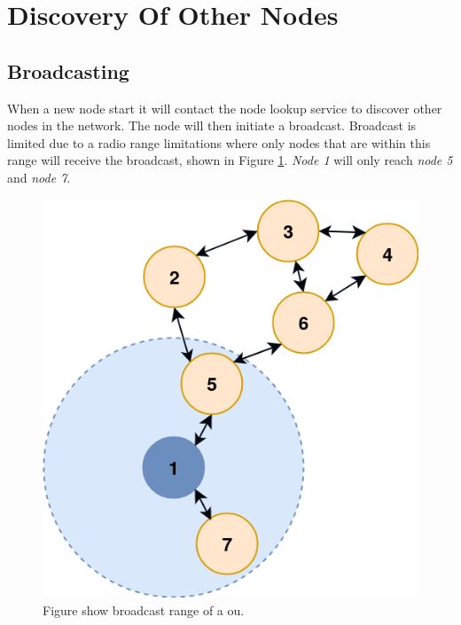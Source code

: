 \documentclass[USenglish]{uit-thesis}
\begin{document}
\section{Discovery Of Other Nodes}
\subsection{Broadcasting}
When a new node start it will contact the node lookup service to discover other nodes in the network. The node will then initiate a broadcast.
Broadcast is limited due to a radio range limitations where only nodes that are within this range will receive the broadcast, shown in Figure \ref{fig:broadcast_range}. \textit{Node 1} will only reach \textit{node 5} and \textit{node 7}.


\begin{figure}
\centering
\includegraphics[scale=0.4]{broadcast_range.png}
\caption{Figure show broadcast range of a \gls{ou}.}
\label{fig:broadcast_range}
\end{figure}
\end{document}
